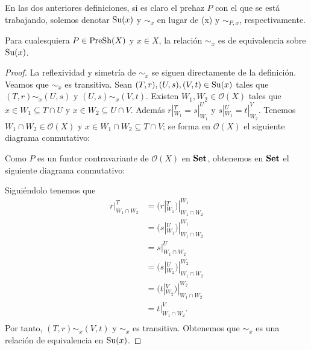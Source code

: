 En las dos anteriores definiciones, si es claro el prehaz $P$ con el que se está trabajando, solemos denotar $\normalfont{\text{Su}}(x)$ y $\sim_{x}$ en lugar de \PSu(x) y $\sim_{P,x}$, respectivamente.
\begin{Prop}
   Para cualesquiera $P\in\normalfont{\text{PreSh}}(X)$ y $x\in X$, la relación $\sim_{x}$ es de equivalencia sobre $\normalfont{\text{Su}}(x)$.
\end{Prop}
\begin{proof}
   La reflexividad y simetría de $\sim_{x}$ se siguen directamente de la definición. Veamos que $\sim_{x}$ es transitiva. Sean $(T,r),(U,s),(V,t)\in\normalfont{\text{Su}}(x)$ tales que $(T,r)\sim_{x}(U,s)$ y $(U,s)\sim_{x}(V,t)$. Existen $W_1,W_2\in\mathcal{O}(X)$ tales que $x\in W_1\subseteq T\cap U$ y $x\in W_2\subseteq U\cap V$. Además $r|^{T}_{W_1}=s|^{U}_{W_1}$ y $s|^{U}_{W_1}=t|^{V}_{W_2}$. Tenemos $W_1\cap W_2\in\mathcal{O}(X)$ y $x\in W_1\cap W_2\subseteq T\cap V$; se forma en $\mathcal{O}(X)$ el siguiente diagrama conmutativo:
   
   
   Como $P$ es un funtor contravariante de $\mathcal{O}(X)$ en $\normalfont{\textbf{Set}}$, obtenemos en $\normalfont{\textbf{Set}}$ el siguiente diagrama conmutativo:
   
   Siguiéndolo tenemos que
   $$
   \begin{aligned}
      r|^{T}_{W_1\cap W_2}&=(r|^{T}_{W_1})|^{W_1}_{W_1\cap W_2}\\
                          &=(s|^{U}_{W_1})|^{W_1}_{W_1\cap W_2}\\
                          &=s|^{U}_{W_1\cap W_2}\\
                          &=(s|^{U}_{W_2})|^{W_2}_{W_1\cap W_2}\\
                          &=(t|^{V}_{W_2})|^{W_2}_{W_1\cap W_2}\\
                          &=t|^{V}_{W_1\cap W_2}.\\
   \end{aligned}
   $$
   Por tanto, $(T,r)\sim_{x} (V,t)$ y $\sim_{x}$ es transitiva. Obtenemos que $\sim_{x}$ es una relación de equivalencia en $\normalfont{\text{Su}}(x)$.
\end{proof}
